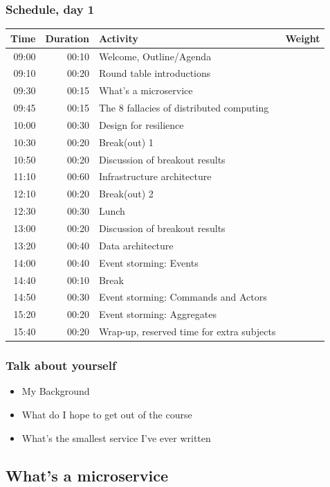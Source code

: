 \documentclass[8pt]{article}
\begin{document}
\subsubsection{Schedule, day 1}
\label{sec:org84f2264}
\begin{center}
\begin{tabular}{rrll}
Time & Duration & Activity & Weight\\
\hline
09:00 & 00:10 & Welcome, Outline/Agenda & \\
09:10 & 00:20 & Round table introductions & \\
09:30 & 00:15 & What's a microservice & \\
09:45 & 00:15 & The 8 fallacies of distributed computing & \\
10:00 & 00:30 & Design for resilience & \\
\hline
10:30 & 00:20 & Break(out) 1 & \\
\hline
10:50 & 00:20 & Discussion of breakout results & \\
11:10 & 00:60 & Infrastructure architecture & \\
\hline
12:10 & 00:20 & Break(out) 2 & \\
12:30 & 00:30 & Lunch & \\
\hline
13:00 & 00:20 & Discussion of breakout results & \\
13:20 & 00:40 & Data architecture & \\
14:00 & 00:40 & Event storming: Events & \\
\hline
14:40 & 00:10 & Break & \\
\hline
14:50 & 00:30 & Event storming: Commands and Actors & \\
15:20 & 00:20 & Event storming: Aggregates & \\
\hline
15:40 & 00:20 & Wrap-up, reserved time for extra subjects & \\
\hline
\end{tabular}
\end{center}
\subsubsection{Talk about yourself}
\label{sec:org0224bd3}
\begin{itemize}
\item My Background
\item What do I hope to get out of the course
\item What's the smallest service I've ever written
\end{itemize}
\subsection{What's a microservice}
\label{sec:orgb46bfaf}
\end{document}
